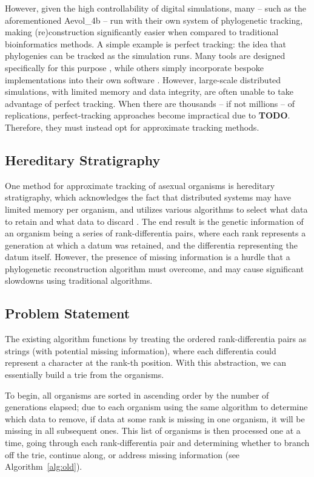 However, given the high controllability of digital simulations, many -- such as the aforementioned Aevol\_4b -- run with their own system of phylogenetic tracking, making (re)construction significantly easier when compared to traditional bioinformatics methods. A simple example is perfect tracking: the idea that phylogenies can be tracked as the simulation runs. Many tools are designed specifically for this purpose \citep{dolson2024phylotrack}, while others simply incorporate bespoke implementations into their own software \citep{ofria2004avida}. However, large-scale distributed simulations, with limited memory and data integrity, are often unable to take advantage of perfect tracking. When there are thousands -- if not millions -- of replications, perfect-tracking approaches become impractical due to \textbf{TODO}. Therefore, they must instead opt for approximate tracking methods.

\subsection{Hereditary Stratigraphy} \label{sec:introduction:hstrat}

One method for approximate tracking of asexual organisms is hereditary stratigraphy, which acknowledges the fact that distributed systems may have limited memory per organism, and utilizes various algorithms to select what data to retain and what data to discard \citep{moreno2022hstrat}. The end result is the genetic information of an organism being a series of rank-differentia pairs, where each rank represents a generation at which a datum was retained, and the differentia representing the datum itself. However, the presence of missing information is a hurdle that a phylogenetic reconstruction algorithm must overcome, and may cause significant slowdowns using traditional algorithms.

\subsection{Problem Statement} \label{sec:introduction:problem}

The existing algorithm functions by treating the ordered rank-differentia pairs as strings (with potential missing information), where each differentia could represent a character at the rank-th position. With this abstraction, we can essentially build a trie \citep{fredkin1960trie} from the organisms. 

To begin, all organisms are sorted in ascending order by the number of generations elapsed; due to each organism using the same algorithm to determine which data to remove, if data at some rank is missing in one organism, it will be missing in all subsequent ones. This list of organisms is then processed one at a time, going through each rank-differentia pair and determining whether to branch off the trie, continue along, or address missing information (see Algorithm~\ref{alg:old}). 

